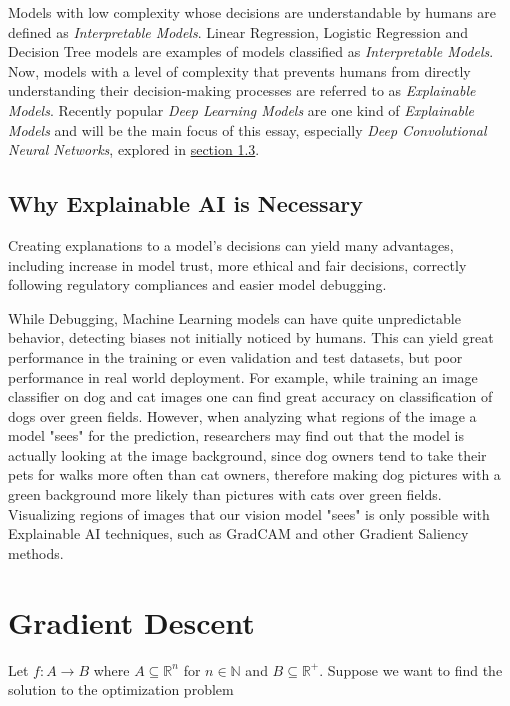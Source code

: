 Models with low complexity whose decisions are understandable by humans are defined as \emph{Interpretable Models}. Linear Regression, Logistic Regression and Decision Tree models are examples of models classified as \emph{Interpretable Models}. 
Now, models with a level of complexity that prevents humans from directly understanding their decision-making processes are referred to as \emph{Explainable Models}. 
Recently popular \emph{Deep Learning Models} are one kind of \emph{Explainable Models} and will be the main focus of this essay, especially \emph{Deep Convolutional Neural Networks}, explored in \hyperref[sec:convolutions]{section 1.3}.

\subsection{Why Explainable AI is Necessary}

Creating explanations to a model's decisions can yield many advantages, including increase in model trust, more ethical and fair decisions, correctly following regulatory compliances and easier model debugging.

While Debugging, Machine Learning models can have quite unpredictable behavior, detecting biases not initially noticed by humans. This can yield great performance in the training or even validation and test datasets,
but poor performance in real world deployment. For example, while training an image classifier on dog and cat images one can find great accuracy on classification of dogs over green fields. However, 
when analyzing what regions of the image a model "sees" for the prediction, researchers may find out that the model is actually looking at the image background, 
since dog owners tend to take their pets for walks more often than cat owners, therefore making dog pictures with a green background more likely than pictures with cats over green fields. 
Visualizing regions of images that our vision model "sees" is only possible with Explainable AI techniques, such as GradCAM \citep{Selvaraju_2019} and other Gradient Saliency methods.


\section{Gradient Descent}

Let \(f\colon A \to B\) where \(A \subseteq \mathbb{R}^n\) for \(n \in \mathbb{N}\) and \(B \subseteq \mathbb{R^+}\). Suppose we want to find the solution to the optimization problem


